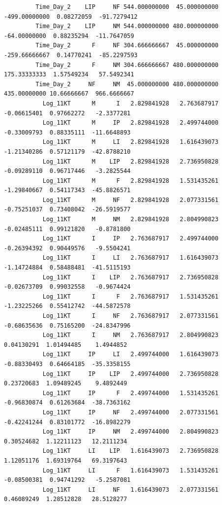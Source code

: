 \documentclass[
  landscape]{article}
\begin{document}
\begin{verbatim}
         Time_Day_2    LIP     NF 544.000000000  45.000000000 -499.00000000  0.08272059  -91.7279412
         Time_Day_2    LIP     NM 544.000000000 480.000000000  -64.00000000  0.88235294  -11.7647059
         Time_Day_2      F     NF 304.666666667  45.000000000 -259.66666667  0.14770241  -85.2297593
         Time_Day_2      F     NM 304.666666667 480.000000000  175.33333333  1.57549234   57.5492341
         Time_Day_2     NF     NM  45.000000000 480.000000000  435.00000000 10.66666667  966.6666667
           Log_11KT      M      I   2.829841928   2.763687917   -0.06615401  0.97662272   -2.3377281
           Log_11KT      M     IP   2.829841928   2.499744000   -0.33009793  0.88335111  -11.6648893
           Log_11KT      M     LI   2.829841928   1.616439073   -1.21340286  0.57121179  -42.8788210
           Log_11KT      M    LIP   2.829841928   2.736950828   -0.09289110  0.96717446   -3.2825544
           Log_11KT      M      F   2.829841928   1.531435261   -1.29840667  0.54117343  -45.8826571
           Log_11KT      M     NF   2.829841928   2.077331561   -0.75251037  0.73408042  -26.5919577
           Log_11KT      M     NM   2.829841928   2.804990823   -0.02485111  0.99121820   -0.8781800
           Log_11KT      I     IP   2.763687917   2.499744000   -0.26394392  0.90449576   -9.5504241
           Log_11KT      I     LI   2.763687917   1.616439073   -1.14724884  0.58488481  -41.5115193
           Log_11KT      I    LIP   2.763687917   2.736950828   -0.02673709  0.99032558   -0.9674424
           Log_11KT      I      F   2.763687917   1.531435261   -1.23225266  0.55412742  -44.5872578
           Log_11KT      I     NF   2.763687917   2.077331561   -0.68635636  0.75165200  -24.8347996
           Log_11KT      I     NM   2.763687917   2.804990823    0.04130291  1.01494485    1.4944852
           Log_11KT     IP     LI   2.499744000   1.616439073   -0.88330493  0.64664185  -35.3358155
           Log_11KT     IP    LIP   2.499744000   2.736950828    0.23720683  1.09489245    9.4892449
           Log_11KT     IP      F   2.499744000   1.531435261   -0.96830874  0.61263684  -38.7363162
           Log_11KT     IP     NF   2.499744000   2.077331561   -0.42241244  0.83101772  -16.8982279
           Log_11KT     IP     NM   2.499744000   2.804990823    0.30524682  1.12211123   12.2111234
           Log_11KT     LI    LIP   1.616439073   2.736950828    1.12051176  1.69319764   69.3197643
           Log_11KT     LI      F   1.616439073   1.531435261   -0.08500381  0.94741292   -5.2587081
           Log_11KT     LI     NF   1.616439073   2.077331561    0.46089249  1.28512828   28.5128277

\end{verbatim}
\end{document}
